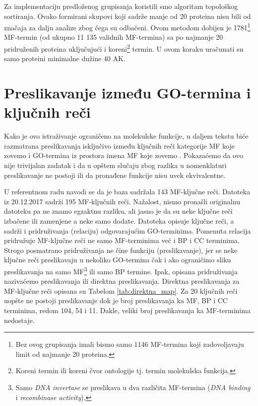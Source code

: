 Za implementaciju predloženog grupisanja koristili smo algoritam topološkog
sortiranja. Ovako formirani skupovi koji sadrže manje od 20 proteina nisu bili
od značaja za dalju analize zbog čega su odbačeni.
Ovom metodom dobijen je 1781\footnote{Bez ovog grupisanja imali bismo samo 1146
MF-termina  koji zadovoljavaju limit od najmanje 20 proteina.} MF-termin (od ukupno
11 135 validnih MF-termina) sa po najmanje 20 pridruženih proteina uključujući i
koreni\footnote{Koreni termin ili koreni čvor ontologije tj.  termin molekulska
funkcija.} termin. U ovom koraku uračunati su samo proteini minimalne dužine 40
AK.

\section{Preslikavanje između GO-termina i \swissprot ključnih reči}
\label{kw2go_mapiranje}

Kako je ovo istraživanje ograničeno na molekulske funkcije, u daljem tekstu
biće razmatrana preslikavanja isključivo između ključnih reči kategorije MF koje
zovemo  i GO-termina iz prostora imena MF koje zovemo
. Pokazaćemo da ovo nije trivijalan zadatak i da u opštem
slučaju zbog razlika u nomenklaturi preslikavanje ne postoji ili da pronađene
funkcije nisu uvek ekvivalentne.

U referentnom radu navodi se da je baza \swissprot sadržala 143 MF-ključne
reči.  Datoteka  \cite{keywlist_txt} iz 20.12.2017 sadrži
195 MF-ključnih reči.  Nažalost, nismo pronašli originalnu 
datoteku pa  ne znamo egzaktnu razliku, ali jasno je da su neke ključne reči
izbačene ili zamenjene a neke samo dodate. Datoteka  opisuje
ključne reči, a sadrži i pridruživanja (relaciju) odgovarajućim GO-terminima.
Pomenuta relacija pridružuje MF-ključne reči ne samo MF-terminima već i BP i CC
terminima. Strogo posmatrano pridruživanja ne čine funkciju (preslikavanje), jer se
neke ključne reči preslikavaju u nekoliko GO-termina čak i ako ograničimo sliku
preslikavanja na samo MF\footnote{Samo \textit{DNA invertase} se preslikava u
dva različita MF-termina (\textit{DNA binding} i \textit{recombinase
activity}).} ili samo BP termine.  Ipak, opisana
pridruživanja nazivaćemo preslikavanja ili direktna preslikavanja. Direktna preslikavanja
za MF-ključne reči opisana su Tabelom \ref{tab:direktna_map}.  Za 20 ključnih reči
uopšte ne postoji preslikavanje dok je broj preslikavanja ka MF, BP i CC terminima,
redom 104, 54 i 11. Dakle, veliki broj preslikavanja ka MF-terminima nedostaje.

